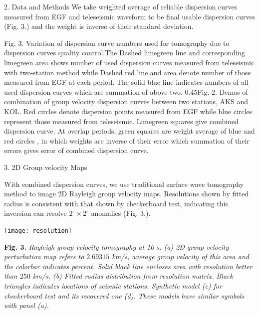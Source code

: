 \documentclass[
    landscape,      %
    paperwidth = 1200mm,
    paperheight = 900mm,
    fontscale = 0.4,
    margin = 1.7cm,
]{baposter}
\begin{document}
\begin{poster}
\begin{posterbox}[column=0, below=auto]{2. Data and Methods}
We take weighted average of reliable dispersion curves measured from EGF and teleseismic waveform to be final
usable dispersion curves (Fig. 3.) and the weight is inverse of their standard deviation.




\hspace{0.1cm}

{Fig. 3.}
{Variation of dispersion curve numbers used for tomography due to dispersion curves quality control.The Dashed limegreen line and corresponding limegreen area shows number of used dispersion
curves measured from teleseismic with two-station method while Dashed red line and area denote number of those measured from EGF at each period. The
solid blue line indicates numbers of all used dispersion curves which are summation of above two.}
{0.45\textwidth}{Fig. 2.}
{Demos of combination of group velocity dispersion curves between two stations, AKS and KOL.
Red circles denote dispersion points measured from EGF while blue circles represent those measured from teleseismic.
Limegreen squares give combined dispersion curve. At overlap periods, green squares are weight average of blue and red circles
, in which weights are inverse of their error which summation of their errors gives error of combined dispersion curve.
}



\end{posterbox}

\begin{posterbox}[column=1]{3. 2D Group velocity Maps}

With combined dispersion curves, we use traditional surface wave tomography method
to image 2D Rayleigh group velocity maps. Resolutions shown by fitted radius is
consistent with that shown by checkerboard test, indicating this inversion can
resolve $2^{\circ} \times 2^{\circ}$ anomalies (Fig. 3.).

\begin{center}
\texttt{[image: resolution]}
\begin{minipage}{0.9\textwidth}
\footnotesize
\vspace{0.2em}
\textbf{Fig. 3.}
\itshape
Rayleigh group velocity tomography at  10 s. (a) 2D group velocity perturbation
map refers to $2.69315$ km/s, average group velocity of this area and the colorbar
indicates percent. Solid black line encloses area with resolution better than $250$ km/s.
(b) Fitted radius distribution from resolution matrix. Black triangles indicates locations
of seismic stations. Synthetic model (c) for checkerboard test and its recovered one (d).
These models have similar symbols with panel (a).
\end{minipage}
\end{center}


\end{posterbox}
\end{poster}
\end{document}
